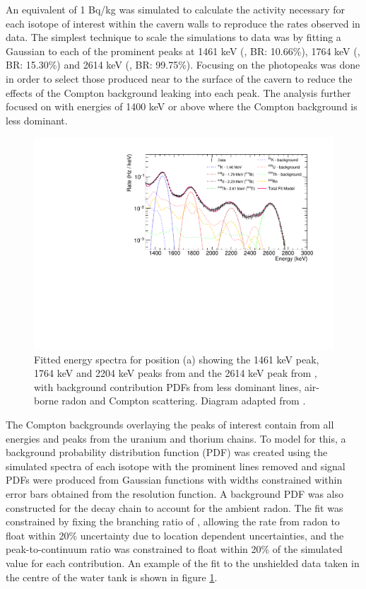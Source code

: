 An equivalent of 1 Bq/kg was simulated to calculate the activity necessary for each isotope of interest within the cavern walls to reproduce the rates observed in data. The simplest technique to scale the simulations to data was by fitting a Gaussian to each of the prominent peaks at 1461 keV (\KFZ{}, BR: 10.66\%), 1764 keV (\BiTOF{}, BR: 15.30\%) and 2614 keV (\TlTZE{}, BR: 99.75\%). Focusing on the photopeaks was done in order to select those \grays{} produced near to the surface of the cavern to reduce the effects of the Compton background leaking into each peak. The analysis further focused on \grays{} with energies of 1400 keV or above where the Compton background is less dominant. 
%
\begin{figure}[t!]
    \centering
    \includegraphics[scale=0.80]{Chapter_3/Figures/Cavern_peak_fits.pdf}
    \caption[Fitted energy spectra for position (a) showing the 1461 keV \KFZ{} peak, 1764 keV and 2204 keV peaks from \UTTE{} and the 2614 keV peak from \ThTTT{}, with background contributions.]
    {Fitted energy spectra for position (a) showing the 1461 keV \KFZ{} peak, 1764 keV and 2204 keV peaks from \UTTE{} and the 2614 keV peak from \ThTTT{}, with background contribution PDFs from less dominant lines, air-borne radon and Compton scattering. Diagram adapted from \cite{Akerib_2020_gray_measurements}.}
    \label{fig:davis_cavern_spectra_fit}
\end{figure}
%
The Compton backgrounds overlaying the peaks of interest contain \grays{} from all energies and peaks from the uranium and thorium chains. To model for this, a background probability distribution function (PDF) was created using the simulated spectra of each isotope with the prominent lines removed and signal PDFs were produced from Gaussian functions with widths constrained within error bars obtained from the resolution function. A background PDF was also constructed for the \RnTTT{} decay chain \grays{} to account for the ambient radon. The fit was constrained by fixing the branching ratio of \BiTOF{}, allowing the rate from radon to  float within 20\% uncertainty due to location dependent uncertainties, and the peak-to-continuum ratio was constrained to float within 20\% of the simulated value for each contribution. An example of the fit to the unshielded data taken in the centre of the water tank is shown in figure \ref{fig:davis_cavern_spectra_fit}.

